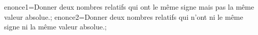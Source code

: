 \documentclass[exercice]{thedocument}%
\begin{document}
%
    \>enonce1=Donner deux nombres relatifs qui ont le même signe mais pas
    la même valeur absolue.;
    \>enonce2=Donner deux nombres relatifs qui n'ont ni le même signe ni la
    même valeur absolue.;
\end{document}
